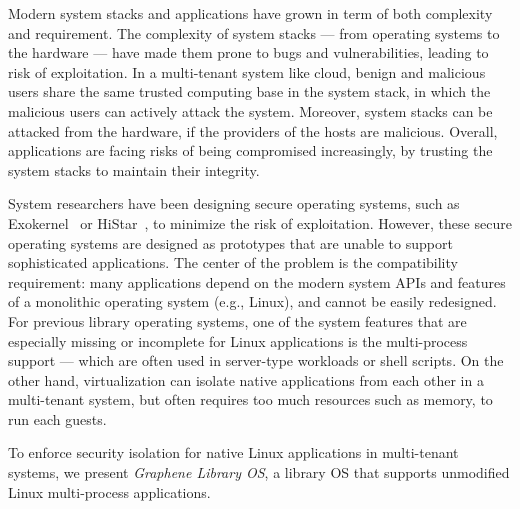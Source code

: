 Modern system stacks and applications have grown in term of both complexity and requirement.
The complexity of system stacks --- from operating systems to the hardware --- have made them prone to bugs and vulnerabilities,
leading to risk of exploitation.
In a multi-tenant system like cloud, benign and malicious users share the same trusted computing base in the system stack,
in which the malicious users can actively attack the system.
Moreover, system stacks can be attacked from the hardware, if the providers of the hosts are malicious.
Overall, applications are facing risks of being compromised increasingly,
by trusting the system stacks to maintain their integrity.

System researchers have been designing secure operating systems, such as Exokernel~\citep{engler95exokernel} or HiStar~\citep{zeldovich+histar}, to minimize the risk of exploitation.
However, these secure operating systems are designed as prototypes that are unable to support sophisticated applications.
The center of the problem is the compatibility requirement:
many applications depend on the modern system APIs and features of a monolithic operating system (e.g., Linux), and cannot be easily redesigned.
For previous library operating systems,
one of the system features that are especially missing or incomplete for Linux applications is the multi-process support
--- which are often used in server-type workloads or shell scripts.
On the other hand, virtualization can isolate native applications from each other in a multi-tenant system,
but often requires too much resources such as memory, to run each guests.

To enforce security isolation for native Linux applications in multi-tenant systems, we present {\em Graphene Library OS},
a library OS that supports unmodified Linux multi-process applications.
